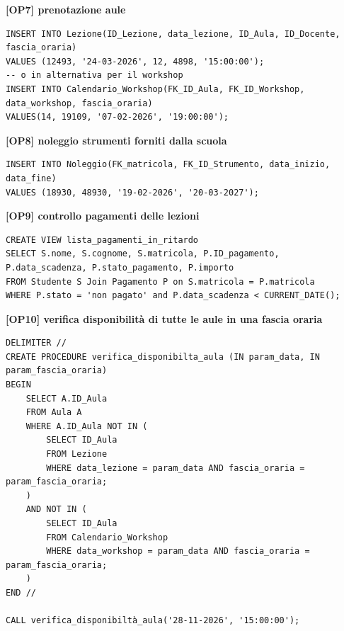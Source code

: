 \textbf{[OP7] prenotazione aule}
\begin{lstlisting}
INSERT INTO Lezione(ID_Lezione, data_lezione, ID_Aula, ID_Docente, fascia_oraria) 
VALUES (12493, '24-03-2026', 12, 4898, '15:00:00'); 
-- o in alternativa per il workshop 
INSERT INTO Calendario_Workshop(FK_ID_Aula, FK_ID_Workshop, data_workshop, fascia_oraria) 
VALUES(14, 19109, '07-02-2026', '19:00:00'); 
\end{lstlisting}
\textbf{[OP8] noleggio strumenti forniti dalla scuola}
\begin{lstlisting} 
INSERT INTO Noleggio(FK_matricola, FK_ID_Strumento, data_inizio, data_fine) 
VALUES (18930, 48930, '19-02-2026', '20-03-2027'); 
\end{lstlisting}
\newpage
\textbf{[OP9] controllo pagamenti delle lezioni}
\begin{lstlisting}
CREATE VIEW lista_pagamenti_in_ritardo 
SELECT S.nome, S.cognome, S.matricola, P.ID_pagamento, P.data_scadenza, P.stato_pagamento, P.importo
FROM Studente S Join Pagamento P on S.matricola = P.matricola
WHERE P.stato = 'non pagato' and P.data_scadenza < CURRENT_DATE(); 
\end{lstlisting}
\textbf{[OP10] verifica disponibilità di tutte le aule in una fascia oraria}
\begin{lstlisting}
DELIMITER //
CREATE PROCEDURE verifica_disponibilta_aula (IN param_data, IN param_fascia_oraria) 
BEGIN 
	SELECT A.ID_Aula
	FROM Aula A 
	WHERE A.ID_Aula NOT IN ( 
		SELECT ID_Aula 
		FROM Lezione 
		WHERE data_lezione = param_data AND fascia_oraria = param_fascia_oraria; 
	) 
	AND NOT IN ( 
		SELECT ID_Aula
		FROM Calendario_Workshop 
		WHERE data_workshop = param_data AND fascia_oraria = param_fascia_oraria; 
	) 
END //

CALL verifica_disponibiltà_aula('28-11-2026', '15:00:00'); 
\end{lstlisting}
\newpage
